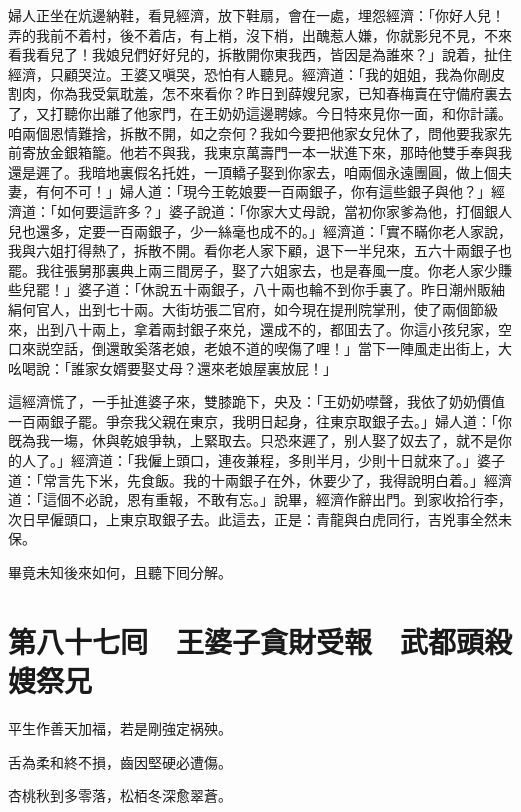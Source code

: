 婦人正坐在炕邊納鞋，看見經濟，放下鞋扇，會在一處，埋怨經濟：「你好人兒！弄的我前不着村，後不着店，有上梢，沒下梢，出醜惹人嫌，你就影兒不見，不來看我看兒了！我娘兒們好好兒的，拆散開你東我西，皆因是為誰來？」說着，扯住經濟，只顧哭泣。王婆又嗔哭，恐怕有人聽見。經濟道：「我的姐姐，我為你剮皮割肉，你為我受氣耽羞，怎不來看你？昨日到薛嫂兒家，已知春梅賣在守備府裏去了，又打聽你出離了他家門，在王奶奶這邊聘嫁。今日特來見你一面，和你計議。咱兩個恩情難捨，拆散不開，如之奈何？我如今要把他家女兒休了，問他要我家先前寄放金銀箱籠。他若不與我，我東京萬壽門一本一狀進下來，那時他雙手奉與我還是遲了。我暗地裏假名托姓，一頂轎子娶到你家去，咱兩個永遠團圓，做上個夫妻，有何不可！」婦人道：「現今王乾娘要一百兩銀子，你有這些銀子與他？」經濟道：「如何要這許多？」婆子說道：「你家大丈母說，當初你家爹為他，打個銀人兒也還多，定要一百兩銀子，少一絲毫也成不的。」經濟道：「實不瞞你老人家說，我與六姐打得熱了，拆散不開。看你老人家下顧，退下一半兒來，五六十兩銀子也罷。我往張舅那裏典上兩三間房子，娶了六姐家去，也是春風一度。你老人家少賺些兒罷！」婆子道：「休說五十兩銀子，八十兩也輪不到你手裏了。昨日潮州販紬絹何官人，出到七十兩。大街坊張二官府，如今現在提刑院掌刑，使了兩個節級來，出到八十兩上，拿着兩封銀子來兑，還成不的，都囬去了。你這小孩兒家，空口來説空話，倒還敢奚落老娘，老娘不道的喫傷了哩！」當下一陣風走出街上，大吆喝說：「誰家女婿要娶丈母？還來老娘屋裏放屁！」

這經濟慌了，一手扯進婆子來，雙膝跪下，央及：「王奶奶噤聲，我依了奶奶價值一百兩銀子罷。爭奈我父親在東京，我明日起身，往東京取銀子去。」婦人道：「你旣為我一塲，休與乾娘爭執，上緊取去。只恐來遲了，别人娶了奴去了，就不是你的人了。」經濟道：「我僱上頭口，連夜兼程，多則半月，少則十日就來了。」婆子道：「常言先下米，先食飯。我的十兩銀子在外，休要少了，我得說明白着。」經濟道：「這個不必說，恩有重報，不敢有忘。」說畢，經濟作辭出門。到家收拾行李，次日早僱頭口，上東京取銀子去。此這去，正是：青龍與白虎同行，吉兇事全然未保。

畢竟未知後來如何，且聽下囘分解。

\chapter*{第八十七囘　王婆子貪財受報　武都頭殺嫂祭兄}

平生作善天加福，若是剛強定祸殃。

舌為柔和終不損，齒因堅硬必遭傷。

杏桃秋到多零落，松栢冬深愈翠蒼。

